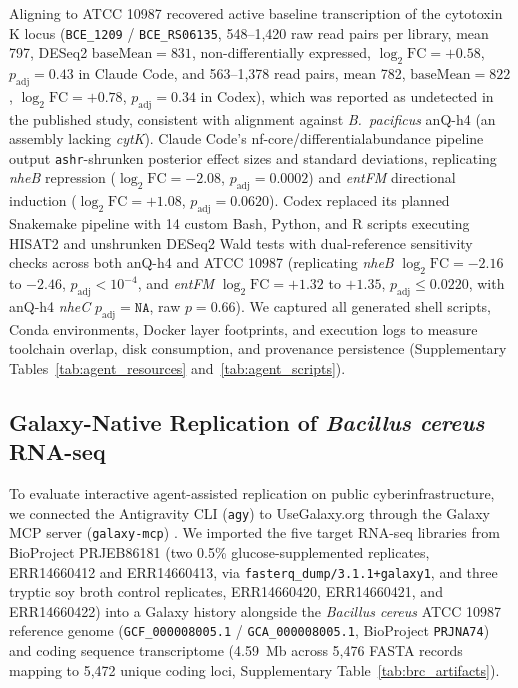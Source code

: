 \documentclass[11pt,letterpaper]{article}
\newcommand{\tool}[1]{\textsf{#1}}
\begin{document}
Aligning to ATCC 10987 recovered active baseline transcription of the cytotoxin K locus (\texttt{BCE\_1209} / \texttt{BCE\_RS06135}, 548--1,420 raw read pairs per library, mean 797, \tool{DESeq2} $\text{baseMean} = 831$, non-differentially expressed, $\log_2\text{FC} = +0.58$, $p_{\text{adj}} = 0.43$ in Claude Code, and 563--1,378 read pairs, mean 782, $\text{baseMean} = 822$, $\log_2\text{FC} = +0.78$, $p_{\text{adj}} = 0.34$ in Codex), which was reported as undetected in the published study, consistent with alignment against \textit{B.\ pacificus} anQ-h4 (an assembly lacking \textit{cytK}). Claude Code's \tool{nf-core/differentialabundance} pipeline output \texttt{ashr}-shrunken posterior effect sizes and standard deviations, replicating \textit{nheB} repression ($\log_2\text{FC} = -2.08$, $p_{\text{adj}} = 0.0002$) and \textit{entFM} directional induction ($\log_2\text{FC} = +1.08$, $p_{\text{adj}} = 0.0620$). Codex replaced its planned \tool{Snakemake} pipeline with 14 custom Bash, Python, and R scripts executing \tool{HISAT2} and unshrunken \tool{DESeq2} Wald tests with dual-reference sensitivity checks across both anQ-h4 and ATCC 10987 (replicating \textit{nheB} $\log_2\text{FC} = -2.16$ to $-2.46$, $p_{\text{adj}} < 10^{-4}$, and \textit{entFM} $\log_2\text{FC} = +1.32$ to $+1.35$, $p_{\text{adj}} \le 0.0220$, with anQ-h4 \textit{nheC} $p_{\text{adj}} = \texttt{NA}$, raw $p = 0.66$). We captured all generated shell scripts, Conda environments, Docker layer footprints, and execution logs to measure toolchain overlap, disk consumption, and provenance persistence (Supplementary Tables~\ref{tab:agent_resources} and~\ref{tab:agent_scripts}).

\subsection*{Galaxy-Native Replication of \textit{Bacillus cereus} RNA-seq}
To evaluate interactive agent-assisted replication on public cyberinfrastructure, we connected the Antigravity CLI (\texttt{agy}) to UseGalaxy.org through the Galaxy MCP server (\texttt{galaxy-mcp}) \cite{galaxymcp2026}. We imported the five target RNA-seq libraries from BioProject PRJEB86181 (two 0.5\% glucose-supplemented replicates, ERR14660412 and ERR14660413, via \nolinkurl{fasterq_dump/3.1.1+galaxy1}, and three tryptic soy broth control replicates, ERR14660420, ERR14660421, and ERR14660422) into a Galaxy history alongside the \textit{Bacillus cereus} ATCC 10987 reference genome (\texttt{GCF\_000008005.1} / \texttt{GCA\_000008005.1}, BioProject \texttt{PRJNA74}) and coding sequence transcriptome (4.59~Mb across 5,476 FASTA records mapping to 5,472 unique coding loci, Supplementary Table~\ref{tab:brc_artifacts}).
\end{document}
